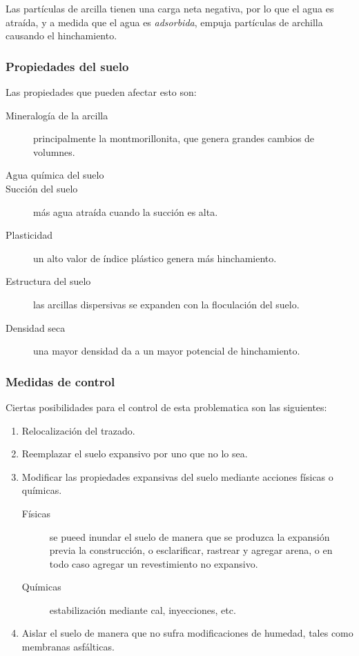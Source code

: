 \documentclass[../main.tex]{subfiles}
\begin{document}
Las partículas de arcilla tienen una carga neta negativa, por lo que el agua es
atraída, y a medida que el agua es \textit{adsorbida}, empuja partículas de archilla
causando el hinchamiento.

\subsubsection{Propiedades del suelo}

Las propiedades que pueden afectar esto son:

\begin{description}
  \item[Mineralogía de la arcilla] principalmente la montmorillonita, que genera
    grandes cambios de volumnes.
  \item[Agua química del suelo]
  \item[Succión del suelo] más agua atraída cuando la succión es alta.
  \item[Plasticidad] un alto valor de índice plástico genera más hinchamiento.
  \item[Estructura del suelo] las arcillas dispersivas se expanden con la 
    floculación del suelo.
  \item[Densidad seca] una mayor densidad da a un mayor potencial de hinchamiento.
\end{description}

\subsubsection{Medidas de control}

Ciertas posibilidades para el control de esta problematica son las siguientes:

\begin{enumerate}
  \item Relocalización del trazado.
  \item Reemplazar el suelo expansivo por uno que no lo sea.
  \item Modificar las propiedades expansivas del suelo mediante acciones 
    físicas o químicas.
    \begin{description}
      \item[Físicas] se pueed inundar el suelo de manera que se produzca la
        expansión previa la construcción, o esclarificar, rastrear y agregar arena,
        o en todo caso agregar un revestimiento no expansivo.
      \item[Químicas] estabilización mediante cal, inyecciones, etc.  
    \end{description}
  \item Aislar el suelo de manera que no sufra modificaciones de humedad, tales
    como membranas asfálticas.
\end{enumerate}
\end{document}
